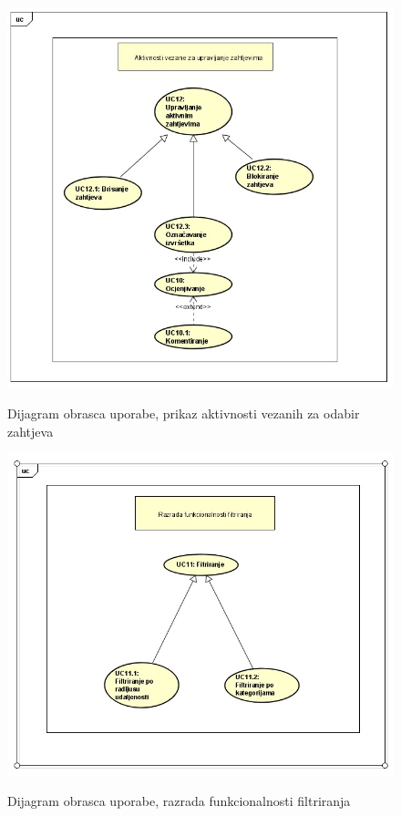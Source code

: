 \begin{figure}[H]
	\includegraphics[scale=0.65]{slike/uc_upravljanje_zahtjevima.jpg} %
	\centering
	\caption \newline Dijagram obrasca uporabe, prikaz aktivnosti vezanih za odabir zahtjeva
	\label{fig:promjene}
\end{figure}

\begin{figure}[H]
	\includegraphics[scale=0.65]{slike/uc_filtriranje.jpg} %
	\centering
	\caption \newline Dijagram obrasca uporabe, razrada funkcionalnosti filtriranja
	\label{fig:promjene}
\end{figure}

